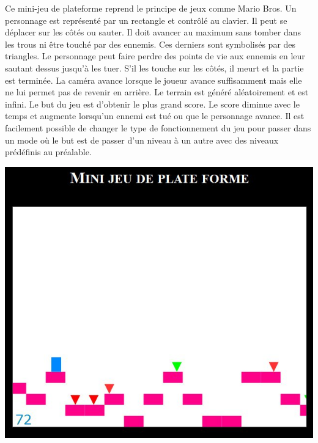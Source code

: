 \begin{minipage}{9cm}
Ce mini-jeu de plateforme reprend le principe de jeux comme Mario Bros.
Un personnage est représenté par un rectangle et contrôlé au clavier. Il peut se déplacer sur les côtés ou sauter.
Il doit avancer au maximum sans tomber dans les trous ni être touché par des ennemis. Ces derniers sont symbolisés par des triangles.
Le personnage peut faire perdre des points de vie aux ennemis en leur sautant dessus jusqu'à les tuer. 
S'il les touche sur les côtés, il meurt et la partie est terminée.
La caméra avance lorsque le joueur avance suffisamment mais elle ne lui permet pas de revenir en arrière.
Le terrain est généré aléatoirement et est infini.
Le but du jeu est d'obtenir le plus grand score. Le score diminue avec le temps et augmente lorsqu'un ennemi est tué ou que le personnage avance.
Il est facilement possible de changer le type de fonctionnement du jeu pour passer dans un mode où le but est de passer d'un niveau à un autre
avec des niveaux prédéfinis au préalable.
\end{minipage}
\hfill
\begin{minipage}{6cm}
 \includegraphics[width=\linewidth]{img/capturejeu_mario}
\end{minipage}


